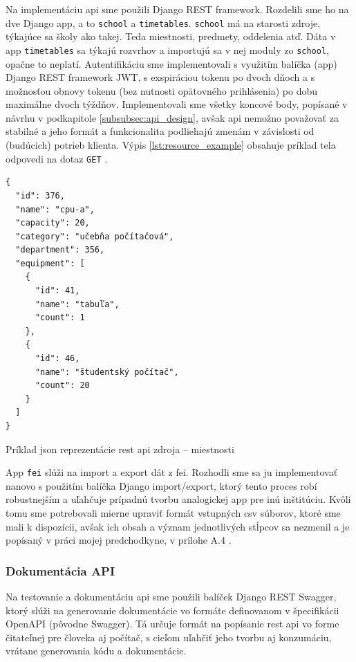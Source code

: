 Na implementáciu \acrshort{api} sme použili Django REST framework. Rozdelili sme
ho na dve Django app, a to \texttt{school} a \texttt{timetables}.
\texttt{school} má na starosti zdroje, týkajúce sa školy ako takej. Teda
miestnosti, predmety, oddelenia atď. Dáta v app \texttt{timetables} sa týkajú
rozvrhov a importujú sa v nej moduly zo \texttt{school}, opačne to neplatí.
Autentifikáciu sme implementovali s využitím balíčka (app) Django REST framework
JWT, s exspiráciou tokenu po dvoch dňoch a s možnosťou obnovy tokenu (bez
nutnosti opätovného prihlásenia) po dobu maximálne dvoch týždňov. Implementovali
sme všetky koncové body, popísané v návrhu v podkapitole
\ref{subsubsec:api_design}, avšak \acrshort{api} nemožno považovať za stabilné a
jeho formát a funkcionalita podliehajú zmenám v závislosti od (budúcich) potrieb
klienta. Výpis \ref{lst:resource_example} obsahuje príklad tela odpovedi na
dotaz \texttt{GET} .

\begin{listing}
  \begin{verbatim}
{
  "id": 376,
  "name": "cpu-a",
  "capacity": 20,
  "category": "učebňa počítačová",
  "department": 356,
  "equipment": [
    {
      "id": 41,
      "name": "tabuľa",
      "count": 1
    },
    {
      "id": 46,
      "name": "študentský počítač",
      "count": 20
    }
  ]
}
  \end{verbatim} 
  \caption{Príklad \acrshort{json} reprezentácie \acrshort{rest} \acrshort{api}
    zdroja -- miestnosti}
\label{lst:resource_example} 
\end{listing}

\newpage

App \texttt{fei} slúži na import a export dát z \acrshort{fei}. Rozhodli sme sa
ju implementovať nanovo s použitím balíčka Django import/export, ktorý tento
proces robí robustnejším a uľahčuje prípadnú tvorbu analogickej app pre inú
inštitúciu. Kvôli tomu sme potrebovali mierne upraviť formát vstupných
\acrshort{csv} súborov, ktoré sme mali k dispozícii, avšak ich obsah a význam
jednotlivých stĺpcov sa nezmenil a je popísaný v práci mojej predchodkyne, v
prílohe A.4 \cite{knap}.

\subsubsection{Dokumentácia API}

Na testovanie a dokumentáciu \acrshort{api} sme použili balíček Django REST
Swagger, ktorý slúži na generovanie dokumentácie vo formáte definovanom v
špecifikácii OpenAPI (pôvodne Swagger). Tá určuje formát na popísanie
\acrshort{rest} \acrshort{api} vo forme čitateľnej pre človeka aj počítač, s
cieľom uľahčiť jeho tvorbu aj konzumáciu, vrátane generovania kódu a
dokumentácie. \cite{swagger}

